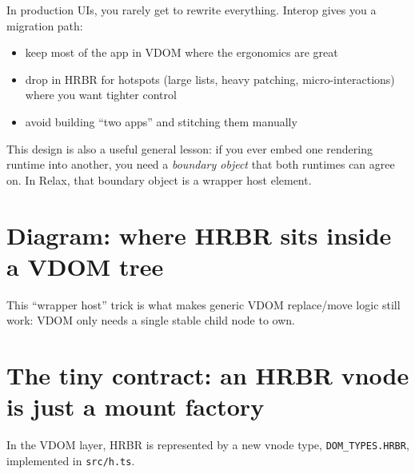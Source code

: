 In production UIs, you rarely get to rewrite everything.
Interop gives you a migration path:

\begin{itemize}
\item keep most of the app in VDOM where the ergonomics are great
\item drop in HRBR for hotspots (large lists, heavy patching, micro-interactions) where you want tighter control
\item avoid building ``two apps'' and stitching them manually
\end{itemize}

This design is also a useful general lesson: if you ever embed one rendering runtime into another, you need a \emph{boundary object} that both runtimes can agree on.
In Relax, that boundary object is a wrapper host element.

\section*{Diagram: where HRBR sits inside a VDOM tree}
\begin{center}
\end{center}

This “wrapper host” trick is what makes generic VDOM replace/move logic still work: VDOM only needs a single stable child node to own.

\section{The tiny contract: an HRBR vnode is just a mount factory}

In the VDOM layer, HRBR is represented by a new vnode type, \texttt{DOM\_TYPES.HRBR}, implemented in \texttt{src/h.ts}.

